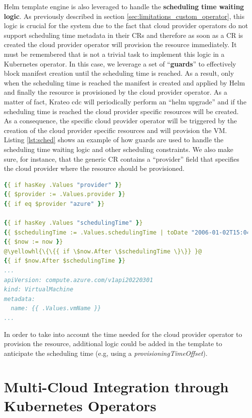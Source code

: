 Helm template engine is also leveraged to handle the \textbf{scheduling time waiting logic}.
As previously described in section \ref{sec:limitations_custom_operator}, this logic is crucial for the system due to the fact that cloud provider operators do not support scheduling time metadata in their CRs and therefore as soon as a CR is created the cloud provider operator will provision the resource immediately.
It must be remembered that is not a trivial task to implement this logic in a Kubernetes operator.
In this case, we leverage a set of ``\textbf{guards}'' to effectively block manifest creation until the scheduling time is reached. 
As a result, only when the scheduling time is reached the manifest is created and applied by Helm and finally the resource is provisioned by the cloud provider operator.
As a matter of fact, Krateo cdc will periodically perform an ``helm upgrade'' and if the scheduling time is reached the cloud provider specific resources will be created. 
As a consequence, the specific cloud provider operator will be triggered by the creation of the cloud provider specific resources and will provision the VM.
Listing \ref{lst:sched} shows an example of how guards are used to handle the scheduling time waiting logic and other scheduling constraints.
We also make sure, for instance, that the generic CR contains a ``provider'' field that specifies the cloud provider where the resource should be provisioned.

\begin{lstlisting}[language=yaml, caption={Scheduling time}, label={lst:sched}]
{{ if hasKey .Values "provider" }}
{{ $provider := .Values.provider }}
{{ if eq $provider "azure" }}

{{ if hasKey .Values "schedulingTime" }}
{{ $schedulingTime := .Values.schedulingTime | toDate "2006-01-02T15:04:05Z" }}
{{ $now := now }}
@\yellowhl{\{\{{ if \$now.After \$schedulingTime \}\}} }@
{{ if $now.After $schedulingTime }}
...
apiVersion: compute.azure.com/v1api20220301
kind: VirtualMachine
metadata:
  name: {{ .Values.vmName }}
...
\end{lstlisting}

In order to take into account the time needed for the cloud provider operator to provision the resource, additional logic could be added in the template to anticipate the scheduling time (e.g, using a \textit{provisioningTimeOffset}).

\section{Multi-Cloud Integration through Kubernetes Operators}

